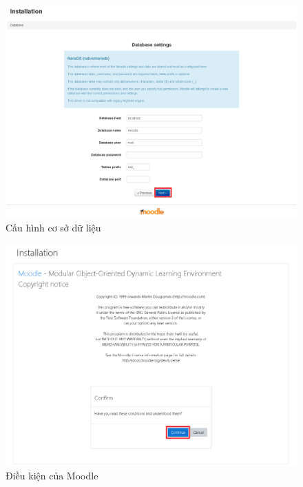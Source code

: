 \begin{center}
	\begin{figure}[htp]
		\begin{center}
			\includegraphics[width=1\linewidth]{img/3}
		\end{center}
		\caption{Cấu hình cơ sở dữ liệu}
		\label{refhinh33}
	\end{figure}
\end{center}

\begin{center}
	\begin{figure}[htp]
		\begin{center}
			\includegraphics[width=0.8\linewidth]{img/4}
		\end{center}
		\caption{Điều kiện của Moodle}
		\label{refhinh34}
	\end{figure}
\end{center}

